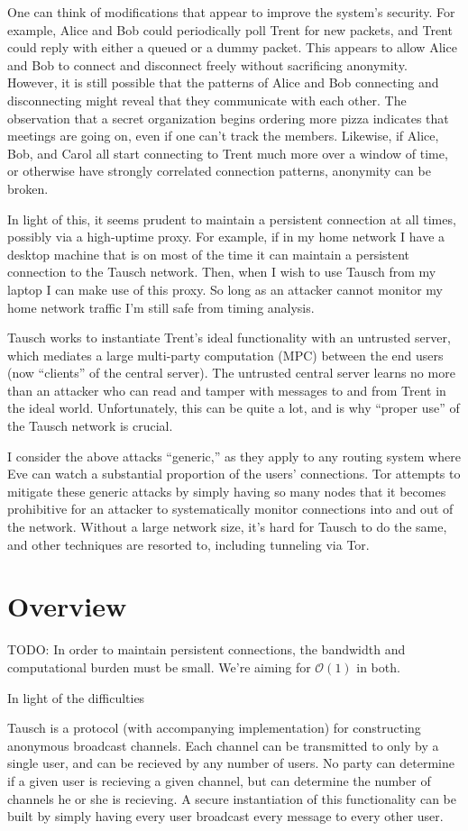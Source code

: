 \documentclass[12pt]{article}
\begin{document}
One can think of modifications that appear to improve the system's security.
For example, Alice and Bob could periodically poll Trent for new packets, and Trent could reply with either a queued or a dummy packet.
This appears to allow Alice and Bob to connect and disconnect freely without sacrificing anonymity.
However, it is still possible that the patterns of Alice and Bob connecting and disconnecting might reveal that they communicate with each other.
The observation that a secret organization begins ordering more pizza indicates that meetings are going on, even if one can't track the members.
Likewise, if Alice, Bob, and Carol all start connecting to Trent much more over a window of time, or otherwise have strongly correlated connection patterns, anonymity can be broken.

In light of this, it seems prudent to maintain a persistent connection at all times, possibly via a high-uptime proxy.
For example, if in my home network I have a desktop machine that is on most of the time it can maintain a persistent connection to the Tausch network.
Then, when I wish to use Tausch from my laptop I can make use of this proxy.
So long as an attacker cannot monitor my home network traffic I'm still safe from timing analysis.

Tausch works to instantiate Trent's ideal functionality with an untrusted server, which mediates a large multi-party computation (MPC) between the end users (now ``clients'' of the central server).
The untrusted central server learns no more than an attacker who can read and tamper with messages to and from Trent in the ideal world.
Unfortunately, this can be quite a lot, and is why ``proper use'' of the Tausch network is crucial.


I consider the above attacks ``generic,'' as they apply to any routing system where Eve can watch a substantial proportion of the users' connections.
Tor attempts to mitigate these generic attacks by simply having so many nodes that it becomes prohibitive for an attacker to systematically monitor connections into and out of the network.
Without a large network size, it's hard for Tausch to do the same, and other techniques are resorted to, including tunneling via Tor.

\section{Overview}
TODO: In order to maintain persistent connections, the bandwidth and computational burden must be small. We're aiming for $\mathcal{O}(1)$ in both.

In light of the difficulties 

Tausch is a protocol (with accompanying implementation) for constructing anonymous broadcast channels.
Each channel can be transmitted to only by a single user, and can be recieved by any number of users.
No party can determine if a given user is recieving a given channel, but can determine the number of channels he or she is recieving.
A secure instantiation of this functionality can be built by simply having every user broadcast every message to every other user.
\end{document}
